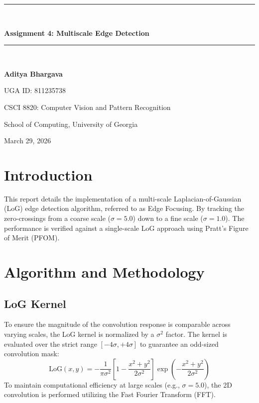 \documentclass[11pt, letterpaper]{article}
\begin{document}
\begin{titlepage}
    \centering
    \vspace*{1.5in}
    \rule{\linewidth}{0.5mm} \\[0.4cm]
    {\huge \bfseries Assignment 4: Multiscale Edge Detection \par}
    \rule{\linewidth}{0.5mm} \\[1.5cm]
    
    \vspace{0.3in}
    {\Large \textbf{Aditya Bhargava} \par}
    {\large UGA ID: 811235738 \par}
    
    \vfill
    {\large CSCI 8820: Computer Vision and Pattern Recognition \par}
    {\large School of Computing, University of Georgia \par}
    {\large March 29, 2026 \par}
\end{titlepage}

\newpage
\tableofcontents
\newpage

\section{Introduction}
This report details the implementation of a multi-scale Laplacian-of-Gaussian (LoG) edge detection algorithm, referred to as Edge Focusing. By tracking the zero-crossings from a coarse scale ($\sigma = 5.0$) down to a fine scale ($\sigma = 1.0$). The performance is verified against a single-scale LoG approach using Pratt's Figure of Merit (PFOM).

\section{Algorithm and Methodology}

\subsection{LoG Kernel}
To ensure the magnitude of the convolution response is comparable across varying scales, the LoG kernel is normalized by a $\sigma^2$ factor. The kernel is evaluated over the strict range $[-4\sigma, +4\sigma]$ to guarantee an odd-sized convolution mask:
\begin{equation}
    \text{LoG}(x, y) = -\frac{1}{\pi \sigma^2} \left[ 1 - \frac{x^2 + y^2}{2\sigma^2} \right] \exp\left(-\frac{x^2 + y^2}{2\sigma^2}\right)
\end{equation}
To maintain computational efficiency at large scales (e.g., $\sigma = 5.0$), the 2D convolution is performed utilizing the Fast Fourier Transform (FFT).
\end{document}

